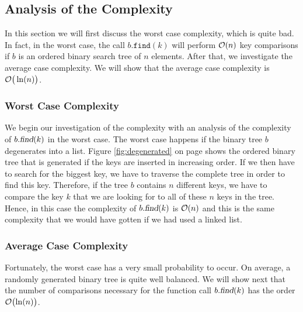 \subsection{Analysis of the Complexity}
In this section we will first discuss the worst case complexity, which is quite bad.  In fact, in
the worst case, the call $b.\mathtt{find}(k)$ will perform $\mathcal{O}(n)$ key comparisons if $b$ is an ordered
binary search tree of $n$ elements.  After that, we investigate the average case complexity.  We
will show that the average case complexity is $\mathcal{O}\bigr(\ln(n)\bigr)$.

\subsubsection{Worst Case Complexity}
We begin our investigation of the complexity with an analysis of the complexity of $b.\textsl{find}(k)$ 
in the worst case.  The worst case happens if the binary tree $b$ degenerates into a list.
Figure \ref{fig:degenerated} on page \pageref{fig:degenerated} shows the ordered binary tree that
is generated if the keys are inserted in increasing order.  If we then have to search for the
biggest key, we have to traverse the complete tree in order to find this key.  Therefore, if the
tree $b$ contains $n$ different keys, we have to compare the key $k$ that we are looking for to all
of these $n$ keys in the tree.  Hence, in this case the complexity of $b.\textsl{find}(k)$ is 
$\mathcal{O}(n)$ and this is the same complexity that we would have gotten if we had used a linked list.


\subsubsection{Average Case Complexity}
Fortunately, the worst case has a very small probability to occur. On average, a randomly generated
binary tree is quite well balanced.  We will show next that the number of comparisons necessary for
the function call $b.\textsl{find}(k)$ has the order $\mathcal{O}\bigl(\ln(n)\bigr)$.  




